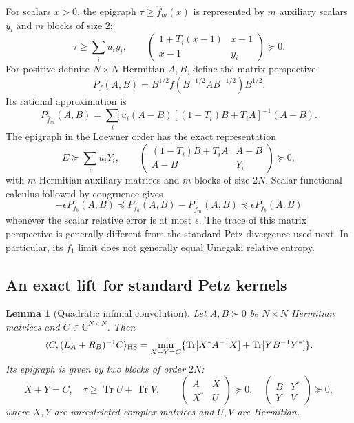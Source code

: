 \documentclass[11pt]{article}
\newtheorem{lemma}[theorem]{Lemma}
\numberwithin{equation}{section}
\newcommand{\C}{\mathbb C}
\newcommand{\tr}{\operatorname{Tr}}
\begin{document}
For scalars $x>0$, the epigraph $\tau\ge\widehat f_m(x)$ is represented
by $m$ auxiliary scalars $y_i$ and $m$ blocks of size $2$:
\begin{equation}\label{eq:scalarSDP}
 \tau\ge\sum_i u_i y_i,\qquad
 \begin{pmatrix}1+T_i(x-1)&x-1\\x-1&y_i\end{pmatrix}\succeq0.
\end{equation}
For positive definite $N\times N$ Hermitian $A,B$, define the matrix
perspective
\[
 P_f(A,B)=B^{1/2}f(B^{-1/2}AB^{-1/2})B^{1/2}.
\]
Its rational approximation is
\[
 P_{\widehat f_m}(A,B)=\sum_i u_i(A-B)
                      [(1-T_i)B+T_iA]^{-1}(A-B).
\]
The epigraph in the Loewner order has the exact representation
\begin{equation}\label{eq:matrixSDP}
 E\succeq\sum_i u_iY_i,\qquad
 \begin{pmatrix}(1-T_i)B+T_iA&A-B\\ A-B&Y_i\end{pmatrix}\succeq0,
\end{equation}
with $m$ Hermitian auxiliary matrices and $m$ blocks of size $2N$.
Scalar functional calculus followed by congruence gives
\begin{equation}\label{eq:matrixError}
 -\epsilon P_{f_b}(A,B)\preceq P_{f_a}(A,B)-P_{\widehat f_m}(A,B)
                          \preceq\epsilon P_{f_b}(A,B)
\end{equation}
whenever the scalar relative error is at most $\epsilon$.
The trace of this matrix perspective is generally different from the
standard Petz divergence used next. In particular, its $f_1$ limit
does not generally equal Umegaki relative entropy.

\subsection{An exact lift for standard Petz kernels}

\begin{lemma}[Quadratic infimal convolution]\label{lem:smalllift}
Let $A,B\succ0$ be $N\times N$ Hermitian matrices and
$C\in\C^{N\times N}$. Then
\begin{equation}\label{eq:infconv}
 \langle C,(L_A+R_B)^{-1}C\rangle_{\rm HS}
 =\min_{X+Y=C}\{\tr[X^*A^{-1}X]+\tr[YB^{-1}Y^*]\}.
\end{equation}
Its epigraph is given by two blocks of order $2N$:
\begin{equation}\label{eq:smalllift}
 X+Y=C,\quad \tau\ge\tr U+\tr V,\qquad
 \begin{pmatrix}A&X\\X^*&U\end{pmatrix}\succeq0,\quad
 \begin{pmatrix}B&Y^*\\Y&V\end{pmatrix}\succeq0,
\end{equation}
where $X,Y$ are unrestricted complex matrices and $U,V$ are Hermitian.
\end{lemma}
\end{document}
